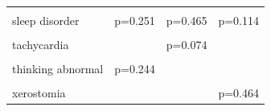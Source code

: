 \begin{table}[!h]
{\begin{tabular}[t]{llll}
\cellcolor{gray!10}{rumination} & \cellcolor{gray!10}{} & \cellcolor{gray!10}{} & \cellcolor{gray!10}{p=0.597}\\
sleep disorder & p=0.251 & p=0.465 & p=0.114\\
\cellcolor{gray!10}{suicidal ideation} & \cellcolor{gray!10}{} & \cellcolor{gray!10}{p=0.365} & \cellcolor{gray!10}{}\\
\addlinespace
tachycardia &  & p=0.074 & \\
\cellcolor{gray!10}{temperature perception disturbances} & \cellcolor{gray!10}{p=0.479} & \cellcolor{gray!10}{p=0.810} & \cellcolor{gray!10}{}\\
thinking abnormal & p=0.244 &  & \\
\cellcolor{gray!10}{weakness} & \cellcolor{gray!10}{} & \cellcolor{gray!10}{} & \cellcolor{gray!10}{p=0.481}\\
xerostomia &  &  & p=0.464\\
\bottomrule
\end{tabular}}
\end{table}
